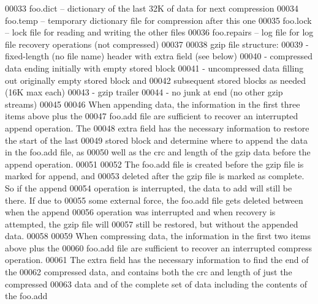 \begin{DoxyCode}
00033 \textcolor{comment}{   foo.dict -- dictionary of the last 32K of data for next compression}
00034 \textcolor{comment}{   foo.temp -- temporary dictionary file for compression after this one}
00035 \textcolor{comment}{   foo.lock -- lock file for reading and writing the other files}
00036 \textcolor{comment}{   foo.repairs -- log file for log file recovery operations (not compressed)}
00037 \textcolor{comment}{}
00038 \textcolor{comment}{   gzip file structure:}
00039 \textcolor{comment}{   - fixed-length (no file name) header with extra field (see below)}
00040 \textcolor{comment}{   - compressed data ending initially with empty stored block}
00041 \textcolor{comment}{   - uncompressed data filling out originally empty stored block and}
00042 \textcolor{comment}{     subsequent stored blocks as needed (16K max each)}
00043 \textcolor{comment}{   - gzip trailer}
00044 \textcolor{comment}{   - no junk at end (no other gzip streams)}
00045 \textcolor{comment}{}
00046 \textcolor{comment}{   When appending data, the information in the first three items above plus the}
00047 \textcolor{comment}{   foo.add file are sufficient to recover an interrupted append operation.  The}
00048 \textcolor{comment}{   extra field has the necessary information to restore the start of the last}
00049 \textcolor{comment}{   stored block and determine where to append the data in the foo.add file, as}
00050 \textcolor{comment}{   well as the crc and length of the gzip data before the append operation.}
00051 \textcolor{comment}{}
00052 \textcolor{comment}{   The foo.add file is created before the gzip file is marked for append, and}
00053 \textcolor{comment}{   deleted after the gzip file is marked as complete.  So if the append}
00054 \textcolor{comment}{   operation is interrupted, the data to add will still be there.  If due to}
00055 \textcolor{comment}{   some external force, the foo.add file gets deleted between when the append}
00056 \textcolor{comment}{   operation was interrupted and when recovery is attempted, the gzip file will}
00057 \textcolor{comment}{   still be restored, but without the appended data.}
00058 \textcolor{comment}{}
00059 \textcolor{comment}{   When compressing data, the information in the first two items above plus the}
00060 \textcolor{comment}{   foo.add file are sufficient to recover an interrupted compress operation.}
00061 \textcolor{comment}{   The extra field has the necessary information to find the end of the}
00062 \textcolor{comment}{   compressed data, and contains both the crc and length of just the compressed}
00063 \textcolor{comment}{   data and of the complete set of data including the contents of the foo.add}

\end{DoxyCode}
